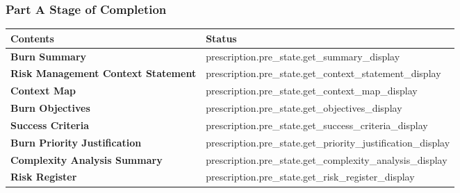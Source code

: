 \subsubsection{Part A Stage of Completion}
\begin{tabu} to \linewidth { | X[l] | X[c] | }
\hline
\textbf{Contents} & \textbf{Status} \\
\hline
\textbf{Burn Summary} & {{ prescription.pre_state.get_summary_display }} \\
\textbf{Risk Management Context Statement} & {{ prescription.pre_state.get_context_statement_display }} \\
\textbf{Context Map} & {{ prescription.pre_state.get_context_map_display }} \\
\textbf{Burn Objectives} & {{ prescription.pre_state.get_objectives_display }} \\
\textbf{Success Criteria} & {{ prescription.pre_state.get_success_criteria_display }} \\
\textbf{Burn Priority Justification} & {{ prescription.pre_state.get_priority_justification_display }} \\
\textbf{Complexity Analysis Summary} & {{ prescription.pre_state.get_complexity_analysis_display }} \\
\textbf{Risk Register} & {{ prescription.pre_state.get_risk_register_display }} \\
\hline
\end{tabu}
\vfill
\clearpage
